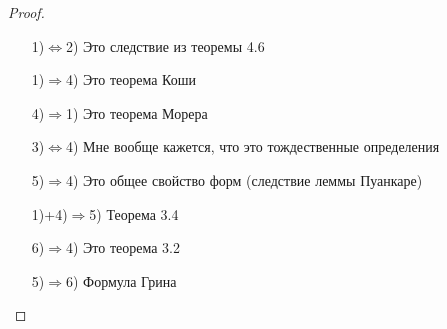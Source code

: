 \begin{proof}\thmslashn
	\begin{enumerate}
		\item[1)$\Leftrightarrow$2)]
		Это следствие из теоремы 4.6
		\item[1)$\Rightarrow$4)]
		Это теорема Коши
		\item[4)$\Rightarrow$1)]
		Это теорема Морера
		\item[3)$\Leftrightarrow$4)]
		Мне вообще кажется, что это тождественные определения
		\item[5)$\Rightarrow$4)]
		Это общее свойство форм (следствие леммы Пуанкаре)
		\item[1)+4)$\Rightarrow$5)]
		Теорема 3.4
		\item[6)$\Rightarrow$4)]
		Это теорема 3.2
		\item[5)$\Rightarrow$6)]
		Формула Грина
		
	\end{enumerate}
	
\end{proof}
